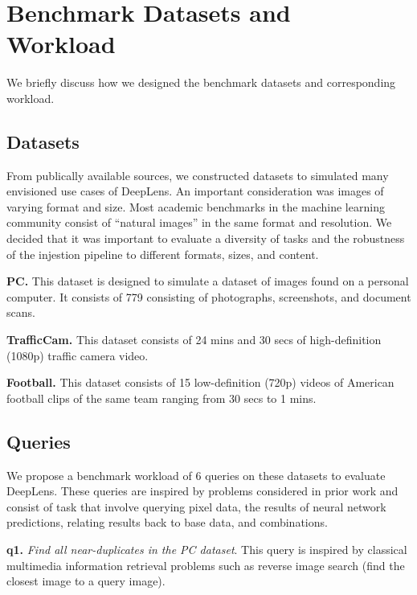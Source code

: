 \section{Benchmark Datasets and \\  Workload}
We briefly discuss how we designed the benchmark datasets and corresponding workload.

\subsection{Datasets}
From publically available sources, we constructed datasets to simulated many envisioned use cases of \textsf{DeepLens}. An important consideration was images of varying format and size. Most academic benchmarks in the machine learning community consist of ``natural images'' in the same format and resolution. We decided that it was important to evaluate a diversity of tasks and the robustness of the injestion pipeline to different formats, sizes, and content. 

\vspace{0.25em} \noindent \textbf{PC.} This dataset is designed to simulate a dataset of images found on a personal computer. It consists of 779 consisting of photographs, screenshots, and document scans. 

\vspace{0.25em} \noindent \textbf{TrafficCam.} This dataset consists of 24 mins and 30 secs of high-definition (1080p) traffic camera video. 

\vspace{0.25em} \noindent \textbf{Football.} This dataset consists of 15 low-definition (720p) videos of American football clips of the same team ranging from 30 secs to 1 mins. 

\subsection{Queries}
We propose a benchmark workload of 6 queries on these datasets to evaluate \textsf{DeepLens}. These queries are inspired by problems considered in prior work and consist of task that involve querying pixel data, the results of neural network predictions, relating results back to base data, and combinations.

\vspace{0.25em} \noindent \textbf{q1.} \emph{Find all near-duplicates in the PC dataset}. This query is inspired by classical multimedia information retrieval problems such as reverse image search (find the closest image to a query image). 

